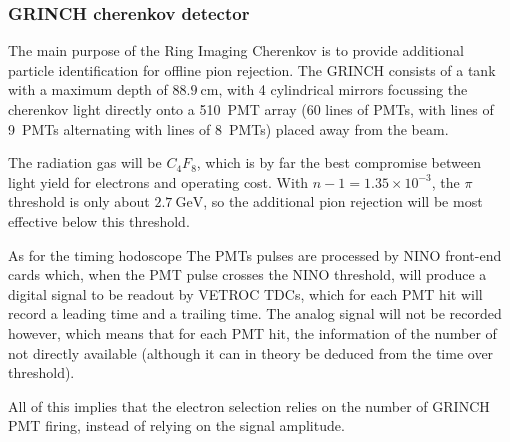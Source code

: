 \subsubsection{GRINCH cherenkov detector}

The main purpose of the Ring Imaging Cherenkov is to provide additional particle identification for offline pion rejection.
The GRINCH consists of a tank with a maximum depth of $88.9~\mathrm{cm}$, with 4 cylindrical mirrors focussing the cherenkov light directly onto a 510~PMT array (60 lines of PMTs, with lines of 9~PMTs alternating with lines of 8~PMTs) placed away from the beam.

The radiation gas will be $C_4F_8$, which is by far the best compromise between light yield for electrons and operating cost.
With $n-1=1.35\times10^{-3}$, the $\pi$ threshold is only about $2.7~\mathrm{GeV}$, so the additional pion rejection will be most effective below this threshold. 

As for the timing hodoscope The PMTs pulses are processed by NINO front-end cards which, when the PMT pulse crosses the NINO threshold, will produce a digital signal to be readout by VETROC TDCs, which for each PMT hit will record a leading time and a trailing time.
The analog signal will not be recorded however, which means that for each PMT hit, the information of the number of not directly available (although it can in theory be deduced from the time over threshold).

All of this implies that the electron selection relies on the number of GRINCH PMT firing, instead of relying on the signal amplitude.
%
%



